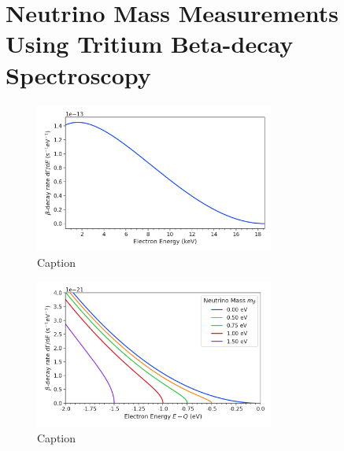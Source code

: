 \section{Neutrino Mass Measurements Using Tritium Beta-decay Spectroscopy}

\begin{figure}[htbp]
    \centering
    \includegraphics[width=0.7\textwidth]{figs/Chapter-2/230302_atomic_tritium_spectrum.png}
    \caption{Caption}
    \label{fig:atomic_tritium_spectrum}
\end{figure}

\begin{figure}[htbp]
    \centering
    \includegraphics[width=0.7\textwidth]{figs/Chapter-2/230302_atomic_tritium_spectrum_near_endpoint.png}
    \caption{Caption}
    \label{fig:atomic_tritium_endpoint}
\end{figure}
